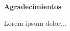 \thispagestyle{plain}
\begin{center}
	\Large    
	\vspace{0.9cm}
	\textbf{Agradecimientos}
\end{center}
Lorem ipsum dolor...